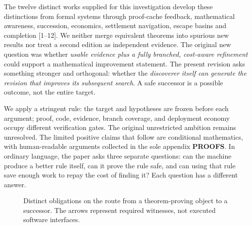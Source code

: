 \documentclass[11pt,letterpaper]{article}
\theoremstyle{definition}
\theoremstyle{remark}
\newcommand{\src}[1]{\textup{[#1]}}
\begin{document}
The twelve distinct works supplied for this investigation develop these distinctions from formal systems through proof-cache feedback, mathematical awareness, succession, economics, settlement navigation, escape basins and completion \src{1--12}. We neither merge equivalent theorems into spurious new results nor treat a second edition as independent evidence. The original new question was whether \emph{usable evidence plus a fully branched, cost-aware refinement} could support a mathematical improvement statement. The present revision asks something stronger and orthogonal: whether the \emph{discoverer itself can generate the revision that improves its subsequent search}. A safe successor is a possible outcome, not the entire target.

We apply a stringent rule: the target and hypotheses are frozen before each argument; proof, code, evidence, branch coverage, and deployment economy occupy different verification gates. The original unrestricted ambition remains unresolved. The limited positive claims that follow are conditional mathematics, with human-readable arguments collected in the sole appendix \textbf{PROOFS}. In ordinary language, the paper asks three separate questions: can the machine produce a better rule itself, can it prove the rule safe, and can using that rule save enough work to repay the cost of finding it? Each question has a different answer.

\begin{figure}[htbp]\centering
{}
\caption{Distinct obligations on the route from a theorem-proving object to a successor. The arrows represent required witnesses, not executed software interfaces.}\end{figure}
\end{document}
